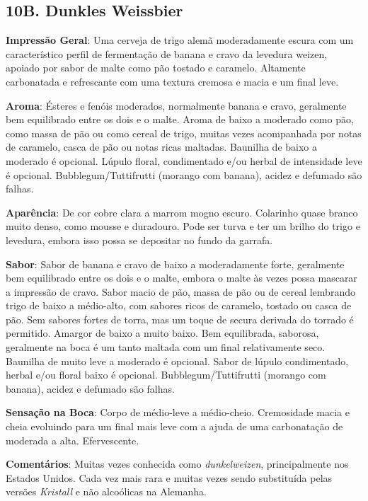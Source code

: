 \subsection*{10B. Dunkles Weissbier}
\textbf{Impressão Geral}: Uma cerveja de trigo alemã moderadamente escura com um característico perfil de fermentação de banana e cravo da levedura weizen, apoiado por sabor de malte como pão tostado e caramelo. Altamente carbonatada e refrescante com uma textura cremosa e macia e um final leve.

\textbf{Aroma}: Ésteres e fenóis moderados, normalmente banana e cravo, geralmente bem equilibrado entre os dois e o malte. Aroma de baixo a moderado como pão, como massa de pão ou como cereal de trigo, muitas vezes acompanhada por notas de caramelo, casca de pão ou notas ricas maltadas. Baunilha de baixo a moderado é opcional. Lúpulo floral, condimentado e/ou herbal de intensidade leve é opcional. Bubblegum/Tuttifrutti (morango com banana), acidez e defumado são falhas.

\textbf{Aparência}: De cor cobre clara a marrom mogno escuro. Colarinho quase branco muito denso, como mousse e duradouro. Pode ser turva e ter um brilho do trigo e levedura, embora isso possa se depositar no fundo da garrafa.

\textbf{Sabor}: Sabor de banana e cravo de baixo a moderadamente forte, geralmente bem equilibrado entre os dois e o malte, embora o malte às vezes possa mascarar a impressão de cravo. Sabor macio de pão, massa de pão ou de cereal lembrando trigo de baixo a médio-alto, com sabores ricos de caramelo, tostado ou casca de pão. Sem sabores fortes de torra, mas um toque de secura derivada do torrado é permitido. Amargor de baixo a muito baixo. Bem equilibrada, saborosa, geralmente na boca é um tanto maltada com um final relativamente seco. Baunilha de muito leve a moderado é opcional. Sabor de lúpulo condimentado, herbal e/ou floral baixo é opcional. Bubblegum/Tuttifrutti (morango com banana), acidez e defumado são falhas.

\textbf{Sensação na Boca}: Corpo de médio-leve a médio-cheio. Cremosidade macia e cheia evoluindo para um final mais leve com a ajuda de uma carbonatação de moderada a alta. Efervescente.

\textbf{Comentários}: Muitas vezes conhecida como \textit{dunkelweizen}, principalmente nos Estados Unidos. Cada vez mais rara e muitas vezes sendo substituída pelas versões \textit{Kristall} e não alcoólicas na Alemanha.

